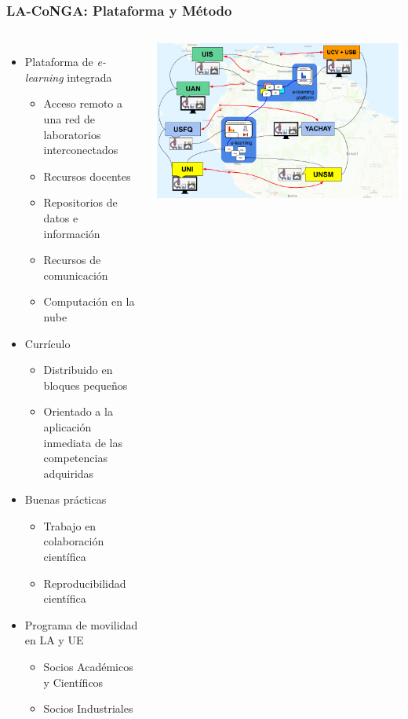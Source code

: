 \begin{frame}[fragile]
\frametitle{LA-CoNGA: Plataforma y Método}
\begin{columns}[c] %

\begin{itemize}
	\item Plataforma de {\it e-learning} integrada \tiny
	\begin{itemize}
		\item Acceso remoto a una red de laboratorios interconectados
		\item Recursos docentes
		\item Repositorios de datos e información
		\item Recursos de comunicación
		\item Computación en la nube
	\end{itemize}
	\item Currículo 
	\begin{itemize}\tiny
		\item Distribuido en bloques pequeños
		\item Orientado a la aplicación inmediata de las competencias adquiridas
	\end{itemize}
	\item Buenas prácticas
	\begin{itemize}\tiny
		\item Trabajo en colaboración científica
		\item Reproducibilidad científica
	\end{itemize}
	\item Programa de movilidad en LA y UE
	\begin{itemize}\tiny
		\item Socios Académicos y Científicos
		\item Socios Industriales
	\end{itemize}	
\end{itemize}
\begin{center}
\includegraphics[scale=0.16]{imagenes/labRemotosElearning.png}
\end{center}


\end{columns}
\end{frame}
